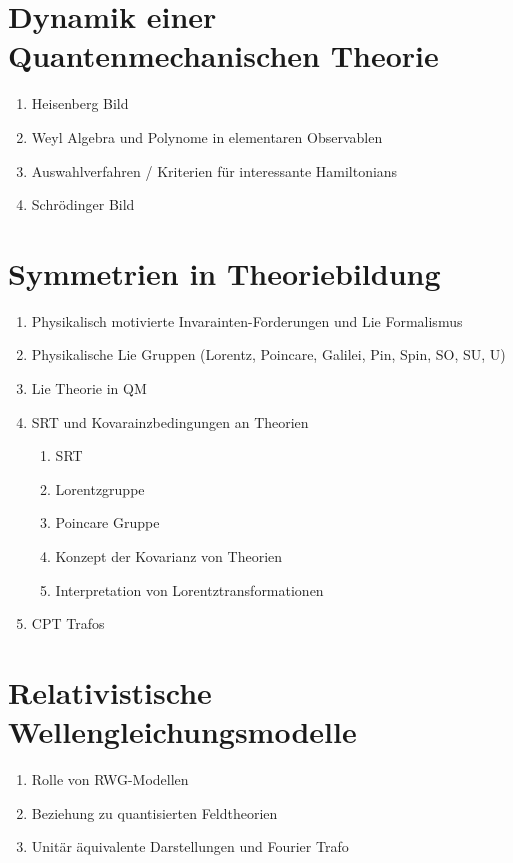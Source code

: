 \documentclass[10pt, letterpaper]{article}
\begin{document}
\section{Dynamik einer Quantenmechanischen Theorie}

\begin{enumerate}
  \item Heisenberg Bild
  \item Weyl Algebra und Polynome in elementaren Observablen
  \item Auswahlverfahren / Kriterien für interessante Hamiltonians
  \item Schrödinger Bild
\end{enumerate}


\section{Symmetrien in Theoriebildung}

  \begin{enumerate}
  \item Physikalisch motivierte Invarainten-Forderungen und Lie Formalismus
  \item Physikalische Lie Gruppen (Lorentz, Poincare, Galilei, Pin, Spin, SO, SU, U)
  \item Lie Theorie in QM
  \item SRT und Kovarainzbedingungen an Theorien
  \begin{enumerate}
    \item SRT
    \item Lorentzgruppe 
    \item Poincare Gruppe
    \item Konzept der Kovarianz von Theorien
    \item Interpretation von Lorentztransformationen
  \end{enumerate}
  \item CPT Trafos
  \end{enumerate}


\section{Relativistische Wellengleichungsmodelle}

\begin{enumerate}
  \item Rolle von RWG-Modellen
  \item Beziehung zu quantisierten Feldtheorien
  \item Unitär äquivalente Darstellungen und Fourier Trafo
\end{enumerate}
\end{document}
